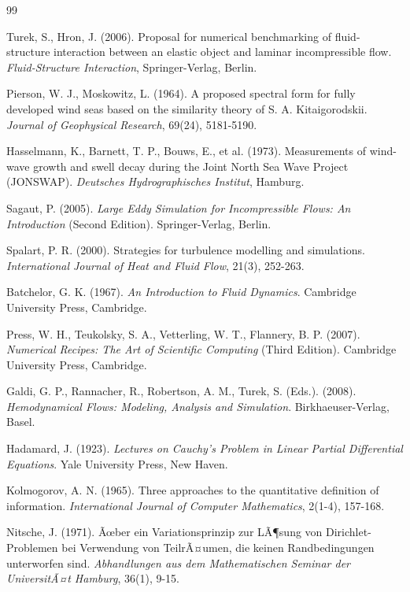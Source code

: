 ﻿\documentclass[a4paper,11pt]{article}
\theoremstyle{definition}
\begin{document}
\begin{thebibliography}{99}

 Turek, S., Hron, J. (2006). Proposal for numerical benchmarking of fluid-structure interaction between an elastic object and laminar incompressible flow. \textit{Fluid-Structure Interaction}, Springer-Verlag, Berlin.

 Pierson, W. J., Moskowitz, L. (1964). A proposed spectral form for fully developed wind seas based on the similarity theory of S. A. Kitaigorodskii. \textit{Journal of Geophysical Research}, 69(24), 5181-5190.

 Hasselmann, K., Barnett, T. P., Bouws, E., et al. (1973). Measurements of wind-wave growth and swell decay during the Joint North Sea Wave Project (JONSWAP). \textit{Deutsches Hydrographisches Institut}, Hamburg.

 Sagaut, P. (2005). \textit{Large Eddy Simulation for Incompressible Flows: An Introduction} (Second Edition). Springer-Verlag, Berlin.

 Spalart, P. R. (2000). Strategies for turbulence modelling and simulations. \textit{International Journal of Heat and Fluid Flow}, 21(3), 252-263.

 Batchelor, G. K. (1967). \textit{An Introduction to Fluid Dynamics}. Cambridge University Press, Cambridge.

 Press, W. H., Teukolsky, S. A., Vetterling, W. T., Flannery, B. P. (2007). \textit{Numerical Recipes: The Art of Scientific Computing} (Third Edition). Cambridge University Press, Cambridge.

 Galdi, G. P., Rannacher, R., Robertson, A. M., Turek, S. (Eds.). (2008). \textit{Hemodynamical Flows: Modeling, Analysis and Simulation}. Birkhaeuser-Verlag, Basel.

 Hadamard, J. (1923). \textit{Lectures on Cauchy's Problem in Linear Partial Differential Equations}. Yale University Press, New Haven.

 Kolmogorov, A. N. (1965). Three approaches to the quantitative definition of information. \textit{International Journal of Computer Mathematics}, 2(1-4), 157-168.

 Nitsche, J. (1971). Ãœber ein Variationsprinzip zur LÃ¶sung von Dirichlet-Problemen bei Verwendung von TeilrÃ¤umen, die keinen Randbedingungen unterworfen sind. \textit{Abhandlungen aus dem Mathematischen Seminar der UniversitÃ¤t Hamburg}, 36(1), 9-15.


\end{thebibliography}
\end{document}
